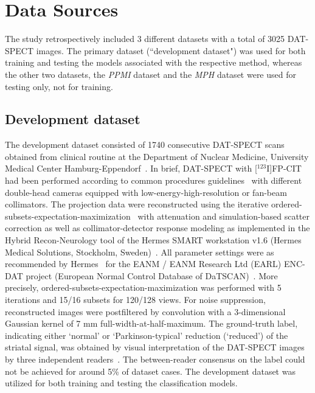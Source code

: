 \section{Data Sources}
\label{sec:data}

The study retrospectively included 3 different datasets with a total of 3025 DAT-SPECT images.
The primary dataset (``development dataset") was used for both training and testing the models associated with the respective method, 
whereas the other two datasets, the \textit{PPMI} dataset and the \textit{MPH} dataset were used for testing only, not for training.

\subsection{Development dataset}
\label{subsec:spect_dataset}

The development dataset consisted of 1740 consecutive DAT-SPECT scans obtained from clinical routine at 
the Department of Nuclear Medicine, University Medical Center Hamburg-Eppendorf~\citep{Schiebler2023}.
In brief, DAT-SPECT with [$^{123}$I]FP-CIT had been performed according to common procedures guidelines~\citep{Darcourt2010-ar, Djang2012-ow} 
with different double-head cameras equipped with low-energy-high-resolution or fan-beam collimators. 
The projection data were reconstructed using the iterative ordered-subsets-expectation-maximization~\citep{Hudson1994} 
with attenuation and simulation-based scatter correction 
as well as collimator-detector response modeling as implemented in the Hybrid Recon-Neurology tool 
of the Hermes SMART workstation v1.6 (Hermes Medical Solutions, Stockholm, Sweden)~\citep{Diemling2021-mg, Sohlberg2012-ep, HybridRecon, Kangasmaa2016-aw}.
All parameter settings were as recommended by Hermes~\citep{Diemling2021-mg} for the EANM / EANM Research Ltd (EARL) ENC-DAT project (European Normal Control Database of DaTSCAN)~\citep{Tossici-Bolt2011-cx, Dickson2010-fm, Varrone2013-it, Tossici-Bolt2017-xj, Dickson2012-hk}.
More precisely, ordered-subsets-expectation-maximization was performed with 5 iterations and 15/16 subsets for 120/128 views. 
For noise suppression, reconstructed images were postfiltered by convolution with a 3-dimensional Gaussian kernel of 7 mm full-width-at-half-maximum. 
The ground-truth label, indicating either `normal' or `Parkinson-typical' reduction (`reduced') of the striatal signal, 
was obtained by visual interpretation of the DAT-SPECT images by three independent readers~\citep{Schiebler2023}. 
The between-reader consensus on the label could not be achieved for around 5\% of dataset cases.
The development dataset was utilized for both training and testing the classification models. 

